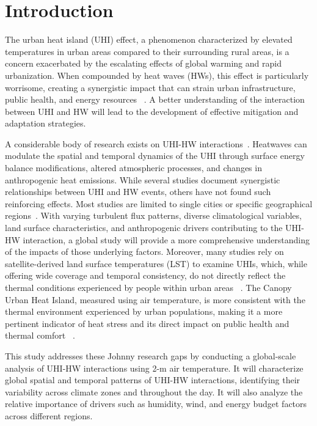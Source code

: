 \section*{Introduction}
The urban heat island (UHI) effect, a phenomenon characterized by elevated temperatures in urban areas compared to their surrounding rural areas, is a concern exacerbated by the escalating effects of global warming and rapid urbanization. When compounded by heat waves (HWs), this effect is particularly worrisome, creating a synergistic impact that can strain urban infrastructure, public health, and energy resources\unskip~\cite{2755510:33598912,2755510:33598911} . A better understanding of the interaction between UHI and HW will lead to the development of effective mitigation and adaptation strategies.

A considerable body of research exists on UHI-HW interactions\unskip~\cite{2755510:33598930}. Heatwaves can modulate the spatial and temporal dynamics of the UHI through surface energy balance modifications, altered atmospheric processes, and changes in anthropogenic heat emissions. While several studies document synergistic relationships between UHI and HW events, others have not found such reinforcing effects. Most studies are limited to single cities or specific geographical regions\unskip~\cite{2755510:33598950,2755510:33598949,2755510:33598945,2755510:33598943,2755510:33598941,2755510:33598938,2755510:33598937,2755510:33598935}. With varying turbulent flux patterns, diverse climatological variables, land surface characteristics, and anthropogenic drivers contributing to the UHI-HW interaction, a global study will provide a more comprehensive understanding of the impacts of those underlying factors. Moreover, many studies rely on satellite-derived land surface temperatures (LST) to examine UHIs, which, while offering wide coverage and temporal consistency, do not directly reflect the thermal conditions experienced by people within urban areas\unskip~\cite{2755510:33598945,2755510:33598947} . The Canopy Urban Heat Island, measured using air temperature, is more consistent with the thermal environment experienced by urban populations, making it a more pertinent indicator of heat stress and its direct impact on public health and thermal comfort\unskip~\cite{2755510:33598934} .

This study addresses these Johnny research gaps by conducting a global-scale analysis of UHI-HW interactions using 2-m air temperature. It will characterize global spatial and temporal patterns of UHI-HW interactions, identifying their variability across climate zones and throughout the day. It will also analyze the relative importance of drivers such as humidity, wind, and energy budget factors across different regions. 